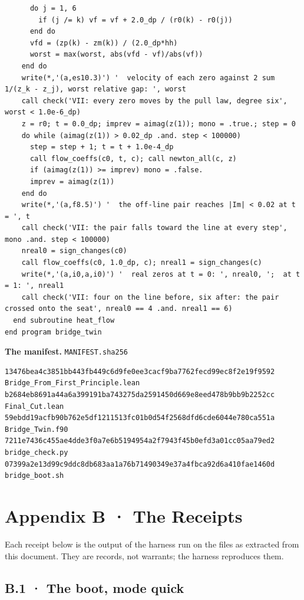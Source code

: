 \documentclass[10pt,twocolumn]{article}
\begin{document}
\begin{Verbatim}
      do j = 1, 6
        if (j /= k) vf = vf + 2.0_dp / (r0(k) - r0(j))
      end do
      vfd = (zp(k) - zm(k)) / (2.0_dp*hh)
      worst = max(worst, abs(vfd - vf)/abs(vf))
    end do
    write(*,'(a,es10.3)') '  velocity of each zero against 2 sum 1/(z_k - z_j), worst relative gap: ', worst
    call check('VII: every zero moves by the pull law, degree six', worst < 1.0e-6_dp)
    z = r0; t = 0.0_dp; imprev = aimag(z(1)); mono = .true.; step = 0
    do while (aimag(z(1)) > 0.02_dp .and. step < 100000)
      step = step + 1; t = t + 1.0e-4_dp
      call flow_coeffs(c0, t, c); call newton_all(c, z)
      if (aimag(z(1)) >= imprev) mono = .false.
      imprev = aimag(z(1))
    end do
    write(*,'(a,f8.5)') '  the off-line pair reaches |Im| < 0.02 at t = ', t
    call check('VII: the pair falls toward the line at every step', mono .and. step < 100000)
    nreal0 = sign_changes(c0)
    call flow_coeffs(c0, 1.0_dp, c); nreal1 = sign_changes(c)
    write(*,'(a,i0,a,i0)') '  real zeros at t = 0: ', nreal0, ';  at t = 1: ', nreal1
    call check('VII: four on the line before, six after: the pair crossed onto the seat', nreal0 == 4 .and. nreal1 == 6)
  end subroutine heat_flow
end program bridge_twin
\end{Verbatim}

\textbf{The manifest.} \texttt{MANIFEST.sha256}

\begin{Verbatim}
13476bea4c3851bb443fb449c6d9fe0ee3cacf9ba7762fecd99ec8f2e19f9592  Bridge_From_First_Principle.lean
b2684eb8691a44a6a399191ba743275da2591450d669e8eed478b9bb9b2252cc  Final_Cut.lean
59ebdd19acfb90b762e5df1211513fc01b0d54f2568dfd6cde6044e780ca551a  Bridge_Twin.f90
7211e7436c455ae4dde3f0a7e6b5194954a2f7943f45b0efd3a01cc05aa79ed2  bridge_check.py
07399a2e13d99c9ddc8db683aa1a76b71490349e37a4fbca92d6a410fae1460d  bridge_boot.sh
\end{Verbatim}

\hypertarget{appendix-b-the-receipts}{%
\section{Appendix B · The Receipts}\label{appendix-b-the-receipts}}

Each receipt below is the output of the harness run on the files as
extracted from this document. They are records, not warrants; the
harness reproduces them.

\hypertarget{b.1-the-boot-mode-quick}{%
\subsection{B.1 · The boot, mode quick}\label{b.1-the-boot-mode-quick}}
\end{document}
